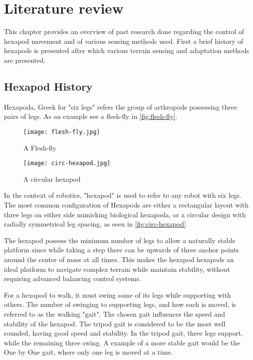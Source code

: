 \chapter{Literature review}
This chapter provides an overview of past research done regarding the control of hexapod movement and of various sensing methods used. First a brief history of hexapods is presented after which various terrain sensing and adaptation methods are presented.

\section{Hexapod History}
Hexapoda, Greek for "six legs" refers the group of arthropods possessing three pairs of legs. As an example see a flesh-fly in \autoref{fig:flesh-fly}.

\begin{figure}[h]
    \centering
    \begin{minipage}{.5\textwidth}
        \centering
        \texttt{[image: flesh-fly.jpg]}
        \caption{A Flesh-fly}
        \label{fig:flesh-fly}
    \end{minipage}%
    \begin{minipage}{.5\textwidth}
        \centering
        \texttt{[image: circ-hexapod.jpg]}
        \caption{A circular hexapod}
        \label{fig:circ-hexapod}  
    \end{minipage}
\end{figure}

In the context of robotics, "hexapod" is used to refer to any robot with six legs. The most common configuration of Hexapods are either a rectangular layout with three legs on either side mimicking biological hexapoda, or a circular design with radially symmetrical leg spacing, as seen in \autoref{fig:circ-hexapod}

The hexapod possess the minimum number of legs to allow a naturally stable platform since while taking a step there can be upwards of three anchor points around the center of mass at all times. This makes the hexapod hexapods an ideal platform to navigate complex terrain while maintain stability, without requiring advanced balancing control systems.

For a hexapod to walk, it must swing some of its legs while supporting with others. The number of swinging to supporting legs, and how each is moved, is referred to as the walking "gait". The chosen gait influences the speed and stability of the hexapod. The tripod gait is considered to be the most well rounded, having good speed and stability. In the tripod gait, three legs support, while the remaining three swing. A example of a more stable gait would be the One by One gait, where only one leg is moved at a time.

